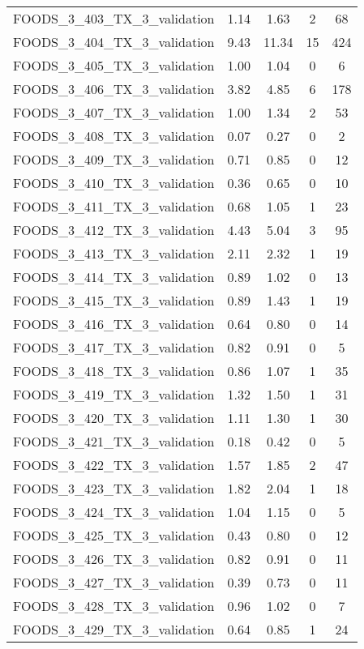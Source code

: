 \begin{table}
\begin{tabular}{|l|c|c|c|c|}
FOODS\_3\_403\_TX\_3\_validation & 1.14 & 1.63 & 2 & 68 \\
FOODS\_3\_404\_TX\_3\_validation & 9.43 & 11.34 & 15 & 424 \\
FOODS\_3\_405\_TX\_3\_validation & 1.00 & 1.04 & 0 & 6 \\
FOODS\_3\_406\_TX\_3\_validation & 3.82 & 4.85 & 6 & 178 \\
FOODS\_3\_407\_TX\_3\_validation & 1.00 & 1.34 & 2 & 53 \\
FOODS\_3\_408\_TX\_3\_validation & 0.07 & 0.27 & 0 & 2 \\
FOODS\_3\_409\_TX\_3\_validation & 0.71 & 0.85 & 0 & 12 \\
FOODS\_3\_410\_TX\_3\_validation & 0.36 & 0.65 & 0 & 10 \\
FOODS\_3\_411\_TX\_3\_validation & 0.68 & 1.05 & 1 & 23 \\
FOODS\_3\_412\_TX\_3\_validation & 4.43 & 5.04 & 3 & 95 \\
FOODS\_3\_413\_TX\_3\_validation & 2.11 & 2.32 & 1 & 19 \\
FOODS\_3\_414\_TX\_3\_validation & 0.89 & 1.02 & 0 & 13 \\
FOODS\_3\_415\_TX\_3\_validation & 0.89 & 1.43 & 1 & 19 \\
FOODS\_3\_416\_TX\_3\_validation & 0.64 & 0.80 & 0 & 14 \\
FOODS\_3\_417\_TX\_3\_validation & 0.82 & 0.91 & 0 & 5 \\
FOODS\_3\_418\_TX\_3\_validation & 0.86 & 1.07 & 1 & 35 \\
FOODS\_3\_419\_TX\_3\_validation & 1.32 & 1.50 & 1 & 31 \\
FOODS\_3\_420\_TX\_3\_validation & 1.11 & 1.30 & 1 & 30 \\
FOODS\_3\_421\_TX\_3\_validation & 0.18 & 0.42 & 0 & 5 \\
FOODS\_3\_422\_TX\_3\_validation & 1.57 & 1.85 & 2 & 47 \\
FOODS\_3\_423\_TX\_3\_validation & 1.82 & 2.04 & 1 & 18 \\
FOODS\_3\_424\_TX\_3\_validation & 1.04 & 1.15 & 0 & 5 \\
FOODS\_3\_425\_TX\_3\_validation & 0.43 & 0.80 & 0 & 12 \\
FOODS\_3\_426\_TX\_3\_validation & 0.82 & 0.91 & 0 & 11 \\
FOODS\_3\_427\_TX\_3\_validation & 0.39 & 0.73 & 0 & 11 \\
FOODS\_3\_428\_TX\_3\_validation & 0.96 & 1.02 & 0 & 7 \\
FOODS\_3\_429\_TX\_3\_validation & 0.64 & 0.85 & 1 & 24 \\

\end{tabular}
\end{table}
